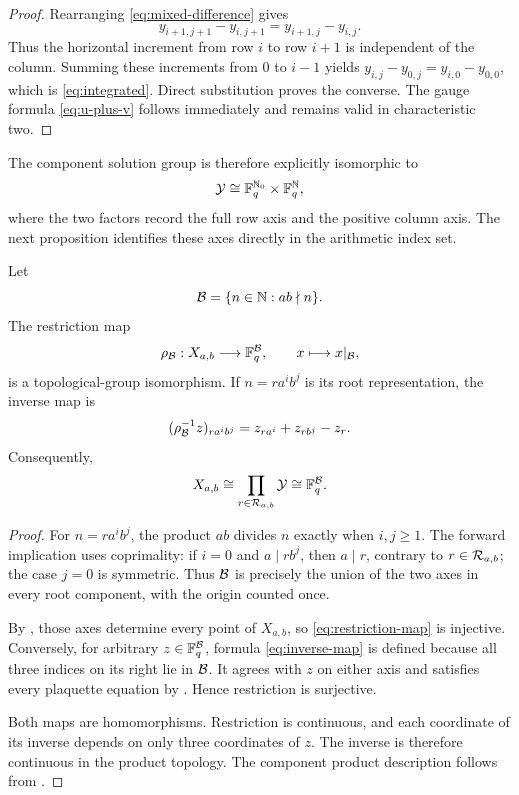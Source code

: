 \begin{proof}
Rearranging \eqref{eq:mixed-difference} gives
\[
 y_{i+1,j+1}-y_{i,j+1}=y_{i+1,j}-y_{i,j}.
\]
Thus the horizontal increment from row $i$ to row $i+1$ is independent of
the column.  Summing these increments from $0$ to $i-1$ yields
$y_{i,j}-y_{0,j}=y_{i,0}-y_{0,0}$, which is
\eqref{eq:integrated}.  Direct substitution proves the converse.  The gauge
formula \eqref{eq:u-plus-v} follows immediately and remains valid in
characteristic two.
\end{proof}

The component solution group is therefore explicitly isomorphic to
\[
 \mathcal Y\cong \mathbb F_q^{\mathbb N_0}\times\mathbb F_q^{\mathbb N},
\]
where the two factors record the full row axis and the positive column axis.
The next proposition identifies these axes directly in the arithmetic index
set.

\begin{proposition}\label{prop:global-homeo}
Let
\[
 \mathcal B=\{n\in\mathbb N:ab\nmid n\}.
\]
The restriction map
\begin{equation}\label{eq:restriction-map}
 \rho_{\mathcal B}:X_{a,b}\longrightarrow\mathbb F_q^{\mathcal B},
 \qquad x\longmapsto x|_{\mathcal B},
\end{equation}
is a topological-group isomorphism.  If
$n=r a^i b^j$ is its root representation, the inverse map is
\begin{equation}\label{eq:inverse-map}
 (\rho_{\mathcal B}^{-1}z)_{r a^i b^j}
 =z_{r a^i}+z_{r b^j}-z_r.
\end{equation}
Consequently,
\begin{equation}\label{eq:global-product}
 X_{a,b}\cong\prod_{r\in\mathcal R_{a,b}}\mathcal Y
 \cong\mathbb F_q^{\mathcal B}.
\end{equation}
\end{proposition}

\begin{proof}
For $n=r a^i b^j$, the product $ab$ divides $n$ exactly when $i,j\geq1$.
The forward implication uses coprimality: if $i=0$ and $a\mid r b^j$, then
$a\mid r$, contrary to $r\in\mathcal R_{a,b}$; the case $j=0$ is symmetric.  Thus
$\mathcal B$ is precisely the union of the two axes in every root component, with
the origin counted once.

By , those axes determine every point of $X_{a,b}$, so
\eqref{eq:restriction-map} is injective.  Conversely, for arbitrary
$z\in\mathbb F_q^{\mathcal B}$, formula \eqref{eq:inverse-map} is defined because all three
indices on its right lie in $\mathcal B$.  It agrees with $z$ on either axis and
satisfies every plaquette equation by .  Hence restriction
is surjective.

Both maps are homomorphisms.  Restriction is continuous, and each coordinate
of its inverse depends on only three coordinates of $z$.  The inverse is
therefore continuous in the product topology.  The component product
description follows from .
\end{proof}

